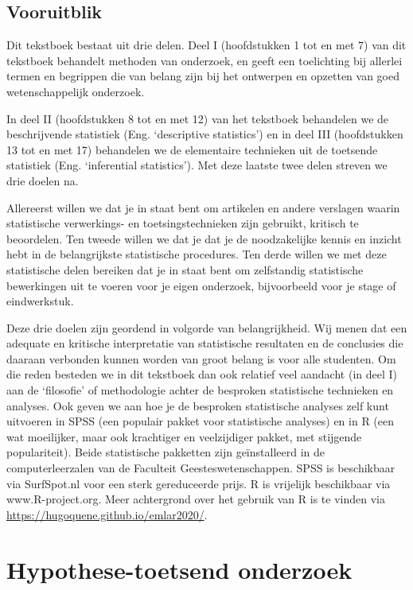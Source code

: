 \documentclass[
]{book}
\begin{document}
\hypertarget{vooruitblik}{%
\section{Vooruitblik}\label{vooruitblik}}

Dit tekstboek bestaat uit drie delen. Deel I (hoofdstukken 1 tot en met 7) van dit tekstboek behandelt
methoden van onderzoek, en geeft een toelichting bij allerlei termen en
begrippen die van belang zijn bij het ontwerpen en opzetten van goed
wetenschappelijk onderzoek.

In deel II (hoofdstukken 8 tot en met 12) van het tekstboek behandelen we de beschrijvende statistiek
(Eng. `descriptive statistics') en in deel III (hoofdstukken 13 tot en met 17) behandelen we de
elementaire technieken uit de toetsende statistiek (Eng. `inferential
statistics'). Met deze laatste twee delen streven we drie doelen na.

Allereerst
willen we dat je in staat bent om artikelen en andere verslagen waarin
statistische verwerkings- en toetsingstechnieken zijn gebruikt, kritisch
te beoordelen.
Ten tweede willen we dat je dat je de noodzakelijke
kennis en inzicht hebt in de belangrijkste statistische procedures.
Ten derde willen we met deze statistische delen bereiken dat je in staat
bent om zelfstandig statistische bewerkingen uit te voeren voor je eigen
onderzoek, bijvoorbeeld voor je stage of eindwerkstuk.

Deze drie doelen zijn geordend in volgorde van belangrijkheid. Wij menen
dat een adequate en kritische interpretatie van statistische resultaten
en de conclusies die daaraan verbonden kunnen worden van groot belang is
voor alle studenten. Om die reden besteden we in dit tekstboek dan ook
relatief veel aandacht (in deel I) aan de `filosofie' of methodologie achter de besproken statistische technieken en analyses. Ook geven we
aan hoe je de besproken statistische analyses zelf kunt uitvoeren in
SPSS (een populair pakket voor statistische analyses) en in R (een wat
moeilijker, maar ook krachtiger en veelzijdiger pakket, met stijgende
populariteit). Beide statistische pakketten zijn geïnstalleerd in de computerleerzalen van de Faculteit Geesteswetenschappen. SPSS is beschikbaar via SurfSpot.nl voor een sterk gereduceerde prijs. R is vrijelijk beschikbaar via www.R-project.org. Meer achtergrond over het gebruik van R is te vinden via \url{https://hugoquene.github.io/emlar2020/}.

\hypertarget{ch:onderzoek}{%
\chapter{Hypothese-toetsend onderzoek}\label{ch:onderzoek}}
\end{document}
